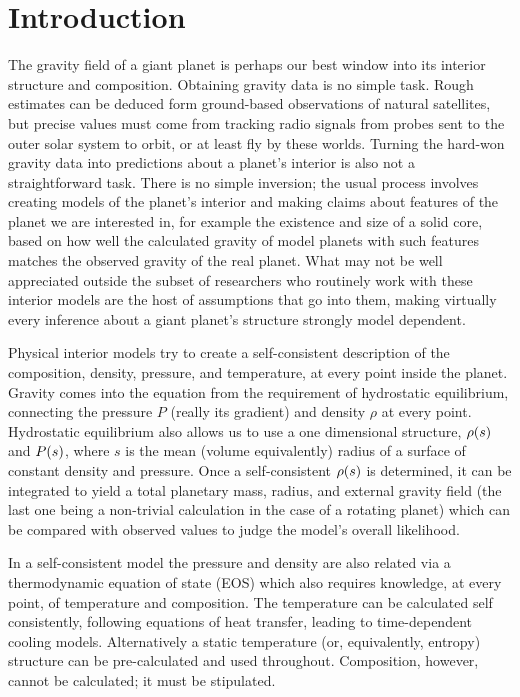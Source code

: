 
\section{Introduction}\label{sec:intro}
The gravity field of a giant planet is perhaps our best window into its interior
structure and composition. Obtaining gravity data is no simple task. Rough
estimates can be deduced form ground-based observations of natural satellites,
but precise values must come from tracking radio signals from probes sent to the
outer solar system to orbit, or at least fly by these worlds. Turning the
hard-won gravity data into predictions about a planet's interior is also not a
straightforward task. There is no simple inversion; the usual process involves
creating models of the planet's interior and making claims about features of the
planet we are interested in, for example the existence and size of a solid core,
based on how well the calculated gravity of model planets with such features
matches the observed gravity of the real planet. What may not be well
appreciated outside the subset of researchers who routinely work with these
interior models are the host of assumptions that go into them, making virtually
every inference about a giant planet's structure strongly model dependent.

Physical interior models try to create a self-consistent description of the
composition, density, pressure, and temperature, at every point inside the
planet. Gravity comes into the equation from the requirement of hydrostatic
equilibrium, connecting the pressure $P$ (really its gradient) and density
$\rho$ at every point. Hydrostatic equilibrium also allows us to use a one
dimensional structure, $\rho(s)$ and $P(s)$, where $s$ is the mean (volume
equivalently) radius of a surface of constant density and pressure. Once a
self-consistent $\rho(s)$ is determined, it can be integrated to yield a total
planetary mass, radius, and external gravity field (the last one being a
non-trivial calculation in the case of a rotating planet) which can be compared
with observed values to judge the model's overall likelihood.

In a self-consistent model the pressure and density are also related via a
thermodynamic equation of state (EOS) which also requires knowledge, at every
point, of temperature and composition. The temperature can be calculated self
consistently, following equations of heat transfer, leading to time-dependent
cooling models. Alternatively a static temperature (or, equivalently, entropy)
structure can be pre-calculated and used throughout. Composition, however,
cannot be calculated; it must be stipulated.

